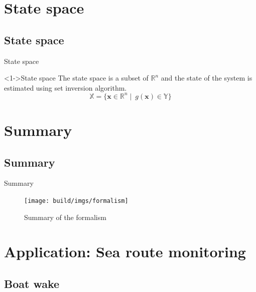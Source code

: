 \documentclass{beamer}
\begin{document}
    \section{State space}

        \subsection{State space}

            \begin{frame}{State space}
                \begin{block}<1->{State space}
                    The state space is a subset of $\mathbb{R}^n$ and the state of the system is estimated using set inversion algorithm.
                    \begin{equation}
                        \mathbb{X} = \lbrace \mathbf{x} \in \mathbb{R}^n \mid\ g(\mathbf{x}) \in \mathbb{Y}\rbrace
                    \end{equation}
                \end{block}
            \end{frame}

    \section{Summary}

        \subsection{Summary}

        \begin{frame}{Summary}
            \begin{figure}
                \texttt{[image: build/imgs/formalism]}
                \caption{Summary of the formalism}
            \end{figure}
        \end{frame}

    \section{Application: Sea route monitoring}

        \subsection{Boat wake}
\end{document}
